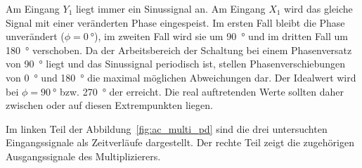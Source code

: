 \documentclass[../main.tex]{subfiles}
\begin{document}
Am Eingang $Y_1$ liegt immer ein Sinussignal an. Am Eingang $X_1$ wird das gleiche Signal mit einer veränderten Phase eingespeist. Im ersten Fall bleibt die Phase unverändert ($\phi = \SI{0}{\degree}$), im zweiten Fall wird sie um \SI{+90}{\degree} und im dritten Fall um \SI{+180}{\degree} verschoben. Da der Arbeitsbereich der Schaltung bei einem Phasenversatz von \SI{90}{\degree} liegt und das Sinussignal periodisch ist, stellen Phasenverschiebungen von \SI{0}{\degree} und \SI{180}{\degree} die maximal möglichen Abweichungen dar. Der Idealwert wird bei $\phi = \SI{90}{\degree}$ bzw. \SI{270}{\degree} der erreicht. Die real auftretenden Werte sollten daher zwischen oder auf diesen Extrempunkten liegen.\par
\medskip

Im linken Teil der Abbildung~\ref{fig:ac_multi_pd} sind die drei untersuchten Eingangssignale als Zeitverläufe dargestellt. Der rechte Teil zeigt die zugehörigen Ausgangssignale des Multiplizierers.\par
\medskip
\end{document}
